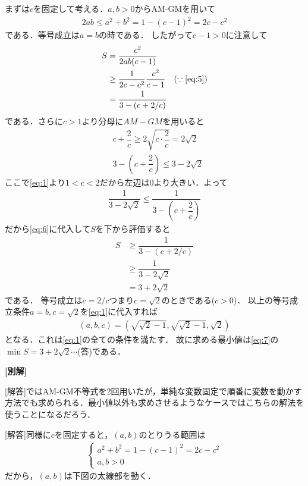 \documentclass[../../main.tex]{subfiles}
\begin{document}
まずは$c$を固定して考える．$a,b>0$からAM-GMを用いて
\begin{align}
  2ab \le a^2+b^2=1-(c-1)^2=2c-c^2 \label{eq:5}
\end{align}
である．等号成立は$a=b$の時である．
したがって$c-1>0$に注意して
\begin{align}
  S
  &=\dfrac{c^2}{2ab(c-1)} \\
  &\ge \dfrac{1}{2c-c^2}\dfrac{c^2}{c-1} \quad (\because\text{\cref{eq:5}}) \\
  &=\dfrac{1}{3-(c+2/c)} \label{eq:6}
\end{align}
である．さらに$c>1$より分母に$AM-GM$を用いると
\begin{align}
  & c + \dfrac{2}{c} \ge 2\sqrt{c\cdot \dfrac{2}{c}} = 2\sqrt{2} \\
  & 3 - \left(c + \dfrac{2}{c}\right) \le 3 - 2\sqrt{2}
\end{align}
ここで\cref{eq:1}より$1<c<2$だから左辺は$0$より大きい．よって
\begin{align}
  \dfrac{1}{3 - 2\sqrt{2}} \le \dfrac{1}{3 - \left(c + \dfrac{2}{c}\right)}
\end{align}
だから\cref{eq:6}に代入して$S$を下から評価すると
\begin{align}
  S
  &\ge \dfrac{1}{3-(c+2/c)} \\
  &\ge \dfrac{1}{3-2\sqrt{2}} \\
  &=   3+2\sqrt{2} \label{eq:7}
\end{align}
である．
等号成立は$c=2/c$つまり$c=\sqrt{2}$のときである($c>0$)．
以上の等号成立条件$a=b,c=\sqrt{2}$を\cref{eq:1}に代入すれば
\begin{align}
  (a,b,c)=\left(\sqrt{\sqrt{2}-1},\sqrt{\sqrt{2}-1},\sqrt{2}\right)
\end{align}
となる．これは\cref{eq:1}の全ての条件を満たす．
故に求める最小値は\cref{eq:7}の$\min S=3+2\sqrt{2}\cdots$(答)である．

{\bf [別解]}

[解答]ではAM-GM不等式を2回用いたが，単純な変数固定で順番に変数を動かす方法でも求められる．最小値以外も求めさせるようなケースではこちらの解法を使うことになるだろう．

[解答]同様に$c$を固定すると，$(a,b)$のとりうる範囲は
\begin{align}
  \begin{cases}
    a^2+b^2 = 1-(c-1)^2=2c-c^2 \\
    a,b > 0
  \end{cases}
\end{align}
だから，$(a,b)$は下図の太線部を動く．
\end{document}
